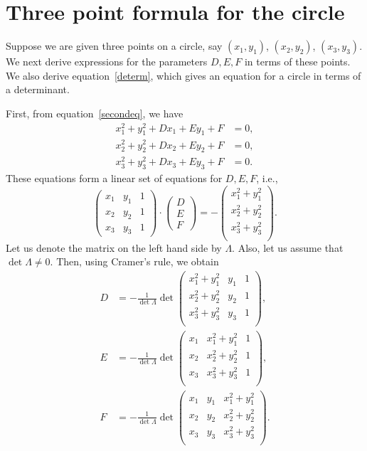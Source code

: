 \documentclass[12pt]{article}
\begin{document}
\section{Three point formula for the circle}

Suppose we are given three points on a circle, say $(x_1, y_1)$, $(x_2, y_2)$, $(x_3, y_3)$. 
We next derive expressions for the parameters $D,E,F$ in terms of these points. 
We also derive equation~\eqref{determ}, which gives an equation for a circle in terms 
of a determinant. 

First, from equation~\eqref{secondeq}, we have
\begin{align*}
x_1^2 + y_1^2 + Dx_1 + Ey_1 + F & =  0, \\
x_2^2 + y_2^2 + Dx_2 + Ey_2 + F & =  0, \\
x_3^2 + y_3^2 + Dx_3 + Ey_3 + F & =  0.
\end{align*} 
These equations form a linear set of equations for $D,E,F$, i.e., 
\begin{equation*}
\begin{pmatrix}
 x_1 & y_1 & 1 \\
 x_2 & y_2 & 1 \\
 x_3 & y_3 & 1 
\end{pmatrix}
\cdot
\begin{pmatrix}
 D  \\E \\F 
\end{pmatrix} 
 =  
 - \begin{pmatrix}
x_1^2 + y_1^2   \\
x_2^2 + y_2^2  \\
x_3^2 + y_3^2  \\
 \end{pmatrix}.
\end{equation*}
Let us denote the matrix on the left hand side by $\Lambda$. Also, let us assume 
that $\det \Lambda \neq 0$. Then, using Cramer's rule, we obtain
\begin{align*}
D & =   - \frac{1}{\det \Lambda} \det \begin{pmatrix}
 x_1^2 + y_1^2  & y_1 & 1 \\
 x_2^2 + y_2^2  & y_2 & 1 \\
 x_3^2 + y_3^2 & y_3 & 1 \\
 \end{pmatrix}, \\
E & =   - \frac{1}{\det \Lambda} \det \begin{pmatrix}
 x_1 & x_1^2 + y_1^2  & 1 \\
 x_2 & x_2^2 + y_2^2  & 1 \\
 x_3 & x_3^2 + y_3^2  & 1 \\
 \end{pmatrix}, \\
F & =   - \frac{1}{\det \Lambda} \det \begin{pmatrix}
 x_1 & y_1 & x_1^2 + y_1^2 \\
 x_2 & y_2 & x_2^2 + y_2^2 \\
 x_3 & y_3 & x_3^2 + y_3^2 \\
 \end{pmatrix}.
\end{align*}
\end{document}
